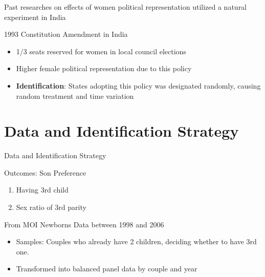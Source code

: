 \documentclass[
  10pt,
  ignorenonframetext,
  aspectratio=43,
]{beamer}
\providecommand{\tightlist}{%
  \setlength{\itemsep}{0pt}\setlength{\parskip}{0pt}}
\begin{document}
\begin{frame}
Past researches on effects of women political representation utilized a
natural experiment in India

\begin{block}{1993 Constitution Amendment in India}
\protect\hypertarget{constitution-amendment-in-india}{}
\begin{itemize}
\tightlist
\item
  1/3 seats reserved for women in local council elections
\item
  Higher female political representation due to this policy
\item
  \textbf{Identification}: States adopting this policy was designated
  randomly, causing random treatment and time variation
\end{itemize}
\end{block}
\end{frame}

\hypertarget{data-and-identification-strategy}{%
\section{Data and Identification
Strategy}\label{data-and-identification-strategy}}

\begin{frame}{Data and Identification Strategy}
\begin{block}{Outcomes: Son Preference}
\protect\hypertarget{outcomes-son-preference}{}
\begin{enumerate}
\tightlist
\item
  Having 3rd child
\item
  Sex ratio of 3rd parity
\end{enumerate}

From MOI Newborns Data between 1998 and 2006

\begin{itemize}
\tightlist
\item
  Samples: Couples who already have 2 children, deciding whether to have
  3rd one.
\item
  Transformed into balanced panel data by couple and year
\end{itemize}
\end{block}
\end{frame}
\end{document}
